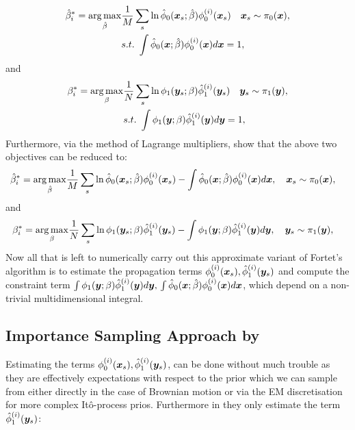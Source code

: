 \documentclass[a4paper,12pt,twoside,openright]{report}
\theoremstyle{definition}
\begin{document}
\begin{align}
    \hat{\beta}^*_i = \operatorname*{arg\,max}_{\hat{\beta} } &\frac{1}{M} \sum_s \operatorname{ln} {\hat{\phi}}_0({\bm{x}}_s; \hat{\beta} )   \phi_0^{(i)}({\bm{x}}_s)
    \quad {\bm{x}}_s\sim \pi_0({\bm{x}}), \nonumber \\
   & s.t. \text{ }  \int {\hat{\phi}}_0({\bm{x}}; \hat{\beta} )   \phi_0^{(i)}({\bm{x}}) d{\bm{x}} =1,
\end{align}
and
\begin{align}
    {\beta}^*_i = \operatorname*{arg\,max}_{{\beta} } &\frac{1}{N} \sum_s \operatorname{ln} \phi_1({\bm{y}}_s; {\beta} )   {\hat{\phi}}_1^{(i)}({\bm{y}}_s)
    \quad {\bm{y}}_s\sim \pi_1({\bm{y}}), \nonumber \\
   & s.t. \text{ }  \int \phi_1({\bm{y}}; {\beta} )   {\hat{\phi}}_1^{(i)}({\bm{y}}) d{\bm{y}} =1,
\end{align}
Furthermore, via the method of Lagrange multipliers, \cite{pavon2018data} show that the above two objectives can be reduced to:
\begin{align}
    \hat{\beta}^*_i = \operatorname*{arg\,max}_{\hat{\beta} } &\frac{1}{M} \sum_s \operatorname{ln} {\hat{\phi}}_0({\bm{x}}_s; \hat{\beta} )   \phi_0^{(i)}({\bm{x}}_s)- \int {\hat{\phi}}_0({\bm{x}}; \hat{\beta} )   \phi_0^{(i)}({\bm{x}}) d{\bm{x}} ,
    \quad {\bm{x}}_s\sim \pi_0({\bm{x}}) ,  \nonumber 
\end{align}
and
\begin{align}
    {\beta}^*_i = \operatorname*{arg\,max}_{{\beta} } &\frac{1}{N} \sum_s \operatorname{ln} \phi_1({\bm{y}}_s; {\beta} )   {\hat{\phi}}_1^{(i)}({\bm{y}}_s)- \int \phi_1({\bm{y}}; {\beta} )   {\hat{\phi}}_1^{(i)}({\bm{y}}) d{\bm{y}} ,
    \quad {\bm{y}}_s\sim \pi_1({\bm{y}}) ,\nonumber 
\end{align}
Now all that is left to numerically carry out this approximate variant of Fortet's algorithm is to estimate the propagation terms $ \phi_0^{(i)}({\bm{x}}_s), {\hat{\phi}}_1^{(i)}({\bm{y}}_s)$ and compute the constraint term $\int \phi_1({\bm{y}}; {\beta} )   {\hat{\phi}}_1^{(i)}({\bm{y}}) d{\bm{y}}, \, \int {\hat{\phi}}_0({\bm{x}}; \hat{\beta} )   \phi_0^{(i)}({\bm{x}}) d{\bm{x}}$, which depend on a non-trivial multidimensional integral.


\subsection{Importance Sampling Approach by \citet{pavon2018data} }

Estimating the terms $ \phi_0^{(i)}({\bm{x}}_s), {\hat{\phi}}_1^{(i)}({\bm{y}}_s)$, can be done without much trouble as they are effectively expectations with respect to the prior which we can sample from either directly in the case of Brownian motion or via the EM discretisation for more complex Itô-process prios. Furthermore in \cite{pavon1991free} they only estimate the term ${\hat{\phi}}_1^{(i)}({\bm{y}}_s)$:
\end{document}
